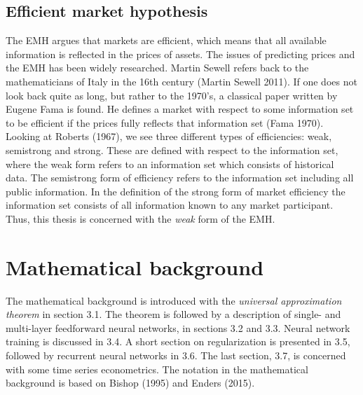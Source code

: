 \documentclass[12pt, letterpaper]{amsart}%
\begin{document}
\subsection{Efficient market hypothesis}
The EMH argues that markets are efficient, which means that all available information is reflected in the prices of assets. The issues of predicting prices and the EMH has been widely researched. Martin Sewell refers back to the mathematicians of Italy in the 16th century (Martin Sewell 2011). If one does not look back quite as long, but rather to the 1970's, a classical paper written by Eugene Fama is found. He defines a market with respect to some information set to be efficient if the prices fully reflects that information set (Fama 1970).
\\

Looking at Roberts (1967), we see three different types of efficiencies: weak, semistrong and strong. These are defined with respect to the information set, where the weak form refers to an information set which consists of historical data. The semistrong form of efficiency refers to the information set including all public information. In the definition of the strong form of market efficiency the information set consists of all information known to any market participant. Thus, this thesis is concerned with the \textit{weak} form of the EMH.

\section{Mathematical background}
The mathematical background is introduced with the \textit{universal approximation theorem} in section 3.1. The theorem is followed by a description of single- and multi-layer feedforward neural networks, in sections 3.2 and 3.3. Neural network training is discussed in 3.4. A short section on regularization is presented in 3.5, followed by recurrent neural networks in 3.6. The last section, 3.7, is concerned with some time series econometrics. The notation in the mathematical background is based on Bishop (1995) and Enders (2015).
\end{document}
